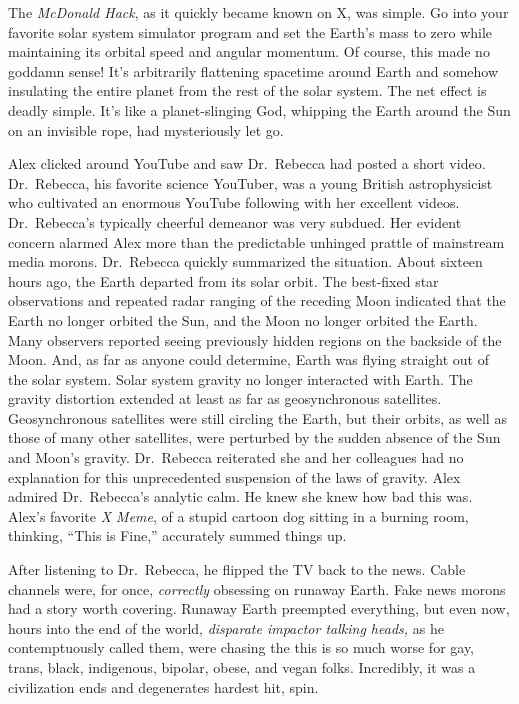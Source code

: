 The \emph{McDonald Hack}, as it quickly became known on X, was simple.
Go into your favorite solar system simulator program and set the Earth's
mass to zero while maintaining its orbital speed and angular momentum.
Of course, this made no goddamn sense! It's arbitrarily flattening
spacetime around Earth and somehow insulating the entire planet from the
rest of the solar system. The net effect is deadly simple. It's like a
planet-slinging God, whipping the Earth around the Sun on an invisible
rope, had mysteriously let go.

Alex clicked around YouTube and saw Dr.~Rebecca had posted a short
video. Dr.~Rebecca, his favorite science YouTuber, was a young British
astrophysicist who cultivated an enormous YouTube following with her
excellent videos. Dr.~Rebecca's typically cheerful demeanor was very
subdued. Her evident concern alarmed Alex more than the predictable
unhinged prattle of mainstream media morons. Dr.~Rebecca quickly
summarized the situation. About sixteen hours ago, the Earth departed
from its solar orbit. The best-fixed star observations and repeated
radar ranging of the receding Moon indicated that the Earth no longer
orbited the Sun, and the Moon no longer orbited the Earth. Many
observers reported seeing previously hidden regions on the backside of
the Moon. And, as far as anyone could determine, Earth was flying
straight out of the solar system. Solar system gravity no longer
interacted with Earth. The gravity distortion extended at least as far
as geosynchronous satellites. Geosynchronous satellites were still
circling the Earth, but their orbits, as well as those of many other
satellites, were perturbed by the sudden absence of the Sun and Moon's
gravity. Dr.~Rebecca reiterated she and her colleagues had no
explanation for this unprecedented suspension of the laws of gravity.
Alex admired Dr.~Rebecca's analytic calm. He knew she knew how bad this
was. Alex's favorite \emph{X Meme}, of a stupid cartoon dog sitting in a
burning room, thinking, ``This is Fine,'' accurately summed things up.

After listening to Dr.~Rebecca, he flipped the TV back to the news.
Cable channels were, for once, \emph{correctly} obsessing on runaway
Earth. Fake news morons had a story worth covering. Runaway Earth
preempted everything, but even now, hours into the end of the world,
\emph{disparate impactor talking heads,} as he contemptuously called
them, were chasing the this is so much worse for gay, trans, black,
indigenous, bipolar, obese, and vegan folks. Incredibly, it was a
civilization ends and degenerates hardest hit, spin.


